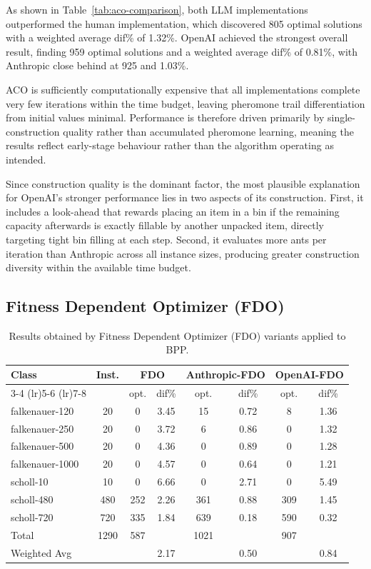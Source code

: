 \documentclass[11pt]{article}
\begin{document}
As shown in Table~\ref{tab:aco-comparison}, both LLM implementations outperformed the human implementation, which discovered 805 optimal solutions with a weighted average dif\% of 1.32\%. OpenAI achieved the strongest overall result, finding 959 optimal solutions and a weighted average dif\% of 0.81\%, with Anthropic close behind at 925 and 1.03\%.

ACO is sufficiently computationally expensive that all implementations complete very few iterations within the time budget, leaving pheromone trail differentiation from initial values minimal. Performance is therefore driven primarily by single-construction quality rather than accumulated pheromone learning, meaning the results reflect early-stage behaviour rather than the algorithm operating as intended.

Since construction quality is the dominant factor, the most plausible explanation for OpenAI's stronger performance lies in two aspects of its construction. First, it includes a look-ahead that rewards placing an item in a bin if the remaining capacity afterwards is exactly fillable by another unpacked item, directly targeting tight bin filling at each step. Second, it evaluates more ants per iteration than Anthropic across all instance sizes, producing greater construction diversity within the available time budget.

\subsection{Fitness Dependent Optimizer (FDO)}
\begin{table}[H]
\centering
\caption{Results obtained by Fitness Dependent Optimizer (FDO) variants applied to BPP.}
\label{tab:fdo-comparison}
\begin{tabular}{l c cc cc cc}
\toprule
\multirow{2}{*}{Class} & \multirow{2}{*}{Inst.} & \multicolumn{2}{c}{FDO} & \multicolumn{2}{c}{Anthropic-FDO} & \multicolumn{2}{c}{OpenAI-FDO} \\
\cmidrule(lr){3-4} \cmidrule(lr){5-6} \cmidrule(lr){7-8}
 & & opt. & dif\% & opt. & dif\% & opt. & dif\% \\
\midrule
falkenauer-120  & 20   & 0    & 3.45 & 15   & 0.72 & 8    & 1.36 \\
falkenauer-250  & 20   & 0    & 3.72 & 6    & 0.86 & 0    & 1.32 \\
falkenauer-500  & 20   & 0    & 4.36 & 0    & 0.89 & 0    & 1.28 \\
falkenauer-1000 & 20   & 0    & 4.57 & 0    & 0.64 & 0    & 1.21 \\
scholl-10       & 10   & 0    & 6.66 & 0    & 2.71 & 0    & 5.49 \\
scholl-480      & 480  & 252  & 2.26 & 361  & 0.88 & 309  & 1.45 \\
scholl-720      & 720  & 335  & 1.84 & 639  & 0.18 & 590  & 0.32 \\
\midrule
Total           & 1290 & 587  &      & 1021 &      & 907  &      \\
Weighted Avg    &      &      & 2.17 &      & 0.50 &      & 0.84 \\
\bottomrule
\end{tabular}
\end{table}
\end{document}
